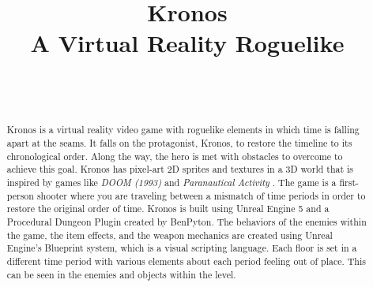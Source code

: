 \documentclass{sigchi}
\def\plaintitle{Kronos\\ \large A Virtual Reality Roguelike}
\begin{document}
\title{\plaintitle}

\author{%
  \\
  \\
}

\maketitle

\begin{abstract}
  Kronos is a virtual reality video game with roguelike elements in which time is falling apart at the seams. It falls on the protagonist, Kronos, to restore the timeline to its chronological order. Along the way, the hero is met with obstacles to overcome to achieve this goal. Kronos has pixel-art 2D sprites and textures in a 3D world that is inspired by games like \textit{DOOM (1993)} \cite{doom} and \textit{Paranautical Activity} \cite{paranautical}. The game is a first-person shooter where you are traveling between a mismatch of time periods in order to restore the original order of time. \newline Kronos is built using Unreal Engine 5 and a Procedural Dungeon Plugin created by BenPyton. The behaviors of the enemies within the game, the item effects, and the weapon mechanics are created using Unreal Engine’s Blueprint system, which is a visual scripting language. Each floor is set in a different time period with various elements about each period feeling out of place. This can be seen in the enemies and objects within the level.
\end{abstract}


\end{document}
